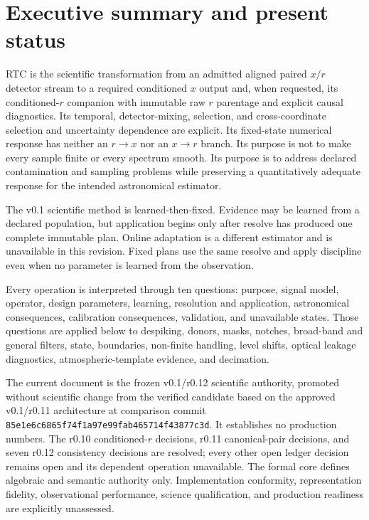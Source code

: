 \documentclass[10pt]{article}
\begin{document}
\section{Executive summary and present status}
\label{sec:rat-summary}
RTC is the scientific transformation from an admitted aligned paired $x/r$
detector stream to a required conditioned $x$ output and, when requested, its
conditioned-$r$ companion with immutable raw $r$ parentage and explicit causal
diagnostics. Its temporal, detector-mixing, selection,
and cross-coordinate selection and uncertainty dependence are explicit. Its
fixed-state numerical response has neither an $r\!\rightarrow x$ nor an
$x\!\rightarrow r$ branch. Its purpose is
not to make every sample finite or every spectrum
smooth. Its purpose is to address declared contamination and sampling
problems while preserving a quantitatively adequate response for the intended
astronomical estimator.

The v0.1 scientific method is learned-then-fixed. Evidence may be learned from
a declared population, but application begins only after resolve has produced
one complete immutable plan. Online adaptation is a different estimator and
is unavailable in this revision. Fixed plans use the same resolve and apply
discipline even when no parameter is learned from the observation.

Every operation is interpreted through ten questions: purpose, signal model,
operator, design parameters, learning, resolution and application,
astronomical consequences, calibration consequences, validation, and
unavailable states. Those questions are applied below to despiking, donors,
masks, notches, broad-band and general filters, state, boundaries, non-finite
handling, level shifts, optical leakage diagnostics, atmospheric-template
evidence, and decimation.

The current document is the frozen v0.1/r0.12 scientific authority, promoted
without scientific change from the verified candidate based on the approved
v0.1/r0.11 architecture at comparison commit\linebreak
\texttt{85e1e6c6865f74f1a97e99fab465714f43877c3d}. It establishes
no production numbers. The r0.10 conditioned-$r$ decisions, r0.11
canonical-pair decisions, and seven r0.12 consistency decisions are resolved;
every other open ledger decision remains open and its dependent
operation unavailable. The formal core defines algebraic and semantic
authority only. Implementation conformity, representation fidelity,
observational performance, science qualification, and production readiness
are explicitly unassessed.
\end{document}
